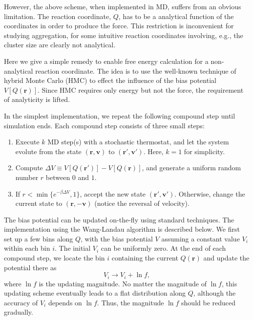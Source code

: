 \documentclass[notitlepage, preprint,superscriptaddress]{revtex4-1}
\newcommand{\vct}[1]{\mathbf{#1}}
\newcommand{\vv}{\vct{v}}
\begin{document}
%
However, the above scheme, when implemented in MD,
suffers from an obvious limitation.
%
The reaction coordinate, $Q$,
has to be a analytical function of the coordinates
in order to produce the force.
%
This restriction is inconvenient
for studying aggregation,
for some intuitive reaction coordinates
involving, e.g., the cluster size
are clearly not analytical.



%
Here we give a simple remedy
to enable free energy calculation
for a non-analytical reaction coordinate.
%
The idea is to use
the well-known technique of hybrid Monte Carlo (HMC)
to effect the influence of the bias potential $V[Q(\vct{r})]$.
%
Since HMC requires only energy but not the force,
the requirement of analyticity is lifted.



%
In the simplest implementation,
we repeat the following compound step until simulation ends.
%
Each compound step consists of three small steps:
%
\begin{enumerate}
  \item Execute $k$ MD step(s) with a stochastic thermostat,
        and let the system evolute
        from the state $(\vct{r}, \vv)$ to $(\vct{r}', \vv')$.
        Here, $k = 1$ for simplicity.

  \item Compute $\Delta V \equiv V[Q(\vct{r}')] - V[Q(\vct{r})]$,
        and generate a uniform random number $r$ between $0$ and $1$.

  \item If $r < \min\{e^{-\beta \Delta V}, 1\}$,
        accept the new state $(\vct{r}', \vv')$.
        Otherwise, change the current state to $(\vct{r}, -\vv)$
        (notice the reversal of velocity).
\end{enumerate}



%
The bias potential can be updated on-the-fly
using standard techniques.
%
The implementation using the Wang-Landau algorithm\cite{
wang2001, *wang2001pre}
is described below.
%
We first set up a few bins along $Q$,
with the bias potential $V$ assuming a constant value $V_i$
within each bin $i$.
%
The initial $V_i$ can be uniformly zero.
%
At the end of each compound step,
we locate the bin $i$ containing the current $Q(\vct{r})$
and update the potential there as
%
\begin{equation}
V_i \rightarrow V_i + \ln f,
\end{equation}
%
where $\ln f$ is the updating magnitude.
%
No matter the magnitude of $\ln f$,
this updating scheme eventually leads to a flat distribution along $Q$,
although the accuracy of $V_i$ depends on $\ln f$.
%
Thus, the magnitude $\ln f$ should be reduced gradually\cite{
wang2001, *wang2001pre, belardinelli2007, *belardinelli2008}.
\end{document}
